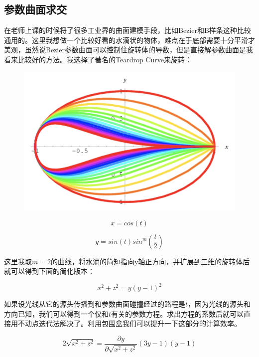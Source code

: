 \documentclass{article}
\begin{document}
\subsection{参数曲面求交}
在老师上课的时候将了很多工业界的曲面建模手段，比如Bezier和B样条这种比较通用的。这里我想做一个比较好看的水滴状的物体，难点在于底部需要十分平滑才美观，虽然说Bezier参数曲面可以控制住旋转体的导数，但是直接解参数曲面是我看来比较好的方法。我选择了著名的Teardrop Curve来旋转：

\begin{figure}[H]
\centering
\includegraphics[scale=1]{3.png}
\end{figure}

\begin{equation}
x = cos(t)
\end{equation}

\begin{equation}
y = sin(t)sin^m(\frac{t}{2})
\end{equation}

这里我取$m=2$的曲线，将水滴的简短指向y轴正方向，并扩展到三维的旋转体后就可以得到下面的简化版本：

\begin{equation}
x^2+z^2 = y(y-1)^2
\end{equation}

如果设光线从它的源头传播到和参数曲面碰撞经过的路程是$t$，因为光线的源头和方向已知，我们可以得到一个仅和$t$有关的参数方程。求出方程的系数后就可以直接用不动点迭代法解决了。利用包围盒我们可以提升一下这部分的计算效率。

\begin{equation}
2\sqrt{x^2 + z^2} = \frac{\partial y}{\partial \sqrt{x^2 + z^2}}(3y-1)(y-1)
\end{equation}
\end{document}
